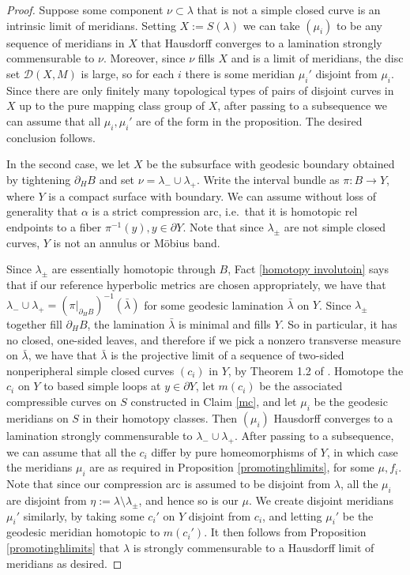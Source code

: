\documentclass[12pt]{amsart}
\theoremstyle{definition}
\theoremstyle{remark}
\begin{document}
\begin{proof}
Suppose some component $\nu \subset \lambda$ that is not a simple closed curve is an intrinsic limit of meridians. Setting $X:=S(\lambda)$ we can take $(\mu_i)$ to be any sequence of meridians in $X$ that Hausdorff converges to a lamination strongly commensurable to $\nu$. Moreover, since $\nu$ fills $X$ and is a limit of meridians, the disc set $\mathcal D(X,M)$ is large, so for each $i$ there is some meridian $\mu_i'$ disjoint from $\mu_i$. Since there are only finitely many topological types of pairs of disjoint curves in $X$ up to the pure mapping class group of $X$, after passing to a subsequence we can assume that all $\mu_i,\mu_i'$ are of the form in the proposition. The desired conclusion follows.

In the second case, we let $X$ be the subsurface with geodesic boundary obtained by tightening $\partial_H B$ and set $\nu=\lambda_-\cup \lambda_+$. Write the interval bundle as $\pi: B \longrightarrow Y$, where $Y$ is a compact surface with boundary. We can assume without loss of generality that $\alpha$ is a strict compression arc, i.e.\ that it is homotopic rel endpoints to a fiber $\pi^{-1}(y),y\in \partial Y$. Note that since $\lambda_\pm$ are not simple closed curves, $Y$ is not an annulus or M\"obius band. 

Since $\lambda_\pm$ are essentially homotopic through $B$, Fact \ref{homotopy involutoin} says that if our reference hyperbolic metrics are chosen appropriately, we have that $\lambda_-\cup \lambda_+= (\pi|_{\partial_HB})^{-1}(\bar \lambda)$ for some geodesic lamination $\bar \lambda$ on $Y$. Since $\lambda_\pm$ together fill $\partial_HB$, the lamination $\bar \lambda$ is minimal and fills $Y$. So in particular, it has no closed, one-sided leaves, and therefore if we pick a nonzero transverse measure on $\bar \lambda$, we have that $\bar \lambda$ is the projective limit of a sequence of two-sided nonperipheral simple closed curves $(c_i)$ in $Y$, by Theorem 1.2 of \cite{erlandsson2021mapping}. Homotope the $c_i$ on $Y$ to based simple loops at $y \in \partial Y$, let $m(c_i)$ be the associated compressible curves on $S$ constructed in Claim \ref{mc}, and let $\mu_i$ be the geodesic meridians on $S$ in their homotopy classes. Then $(\mu_i)$ Hausdorff converges to a lamination strongly commensurable to $\lambda_-\cup\lambda_+$. After passing to a subsequence, we can assume that all the $c_i$ differ by pure homeomorphisms of $Y$, in which case the meridians $\mu_i$ are as required in Proposition \ref{promotinghlimits}, for some $\mu,f_i$.  Note that since our compression arc is assumed to be disjoint from $\lambda$, all the $\mu_i$ are disjoint from $\eta := \lambda \setminus \lambda_\pm$, and hence so is our $\mu$. We create disjoint meridians $\mu_i'$ similarly, by taking some $c_i'$ on $Y$ disjoint from $c_i$, and letting $\mu_i'$ be the geodesic meridian homotopic to $m(c_i')$. It then follows from Proposition \ref{promotinghlimits} that $\lambda$  is strongly commensurable to a Hausdorff limit of meridians as desired.
\end{proof}
\end{document}
